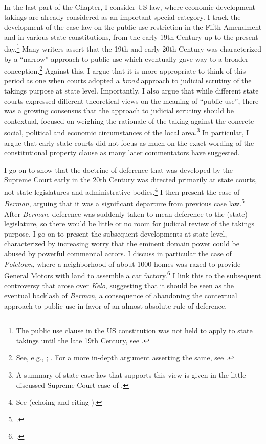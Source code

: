 \documentclass[12pt,a4paper]{article} %
\begin{document}
In the last part of the Chapter, I consider US law, where economic development takings are already considered as an important special category. I track the development of the case law on the public use restriction in the Fifth Amendment and in various state constitutions, from the early 19th Century up to the present day.\footnote{The public use clause in the US constitution was not held to apply to state takings until the late 19th Century, see \cite{chicago97}.} Many writers assert that the 19th and early 20th Century was characterized by a ``narrow'' approach to public use which eventually gave way to a broader conception.\footnote{See, e.g., \cite[483]{walt11}; \cite[203-204]{allen00}. For a more in-depth argument asserting the same, see \cite{nichols40}.} Against this, I argue that it is more appropriate to think of this period as one when courts adopted a {\it broad} approach to judicial scrutiny of the takings purpose at state level. Importantly, I also argue that while different state courts expressed different theoretical views on the meaning of ``public use'', there was a growing consensus that the approach to judicial scrutiny should be contextual, focused on weighing the rationale of the taking against the concrete social, political and economic circumstances of the local area.\footnote{A summary of state case law that supports this view is given in the little discussed Supreme Court case of \cite{hairston08}.}  In particular, I argue that early state courts did not focus as much on the exact wording of the constitutional property clause as many later commentators have suggested.

I go on to show that the doctrine of deference that was developed by the Supreme Court early in the 20th Century was directed primarily at state courts, not state legislatures and administrative bodies.\footnote{See \cite{vester30} (echoing and citing \cite{hairston08}).} I then present the case of {\it Berman}, arguing that it was a significant departure from previous case law.\footcite{berman54} After {\it Berman}, deference was suddenly taken to mean deference to the (state) legislature, so there would be little or no room for judicial review of the takings purpose. I go on to present the subsequent developments at state level, characterized by increasing worry that the eminent domain power could be abused by powerful commercial actors. I discuss in particular the case of {\it Poletown}, where a neighborhood of about 1000 homes was razed to provide General Motors with land to assemble a car factory.\footcite{poletown81} I link this to the subsequent controversy that arose over {\it Kelo}, suggesting that it should be seen as the eventual backlash of {\it Berman}, a consequence of abandoning the contextual approach to public use in favor of an almost absolute rule of deference.
\end{document}
